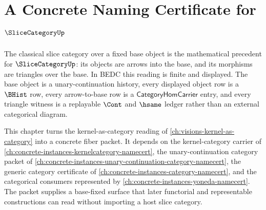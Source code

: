 \chapter{A Concrete Naming Certificate for $\SliceCategoryUp$}
\label{ch:concrete-instances-slicecategory-namecert}

The classical slice category over a fixed base object is the mathematical precedent for $\SliceCategoryUp$: its objects are arrows into the base, and its morphisms are triangles over the base. In BEDC this reading is finite and displayed. The base object is a unary-continuation history, every displayed object row is a $\BHist$ row, every arrow-to-base row is a $\mathsf{CategoryHomCarrier}$ entry, and every triangle witness is a replayable $\Cont$ and $\hsame$ ledger rather than an external categorical diagram.

This chapter turns the kernel-as-category reading of \autoref{ch:visions-kernel-as-category} into a concrete fiber packet. It depends on the kernel-category carrier of \autoref{ch:concrete-instances-kernelcategory-namecert}, the unary-continuation category packet of \autoref{ch:concrete-instances-unary-continuation-category-namecert}, the generic category certificate of \autoref{ch:concrete-instances-category-namecert}, and the categorical consumers represented by \autoref{ch:concrete-instances-yoneda-namecert}. The packet supplies a base-fixed surface that later functorial and representable constructions can read without importing a host slice category.

